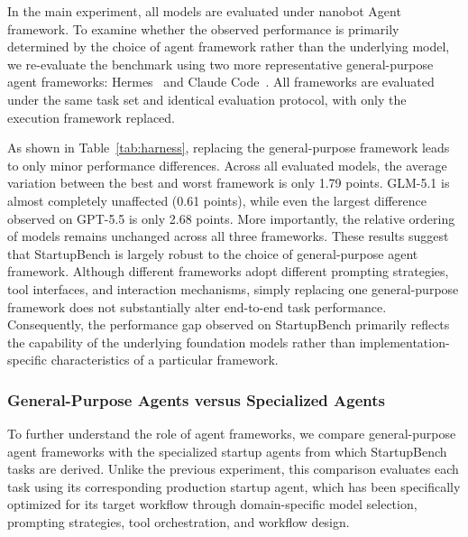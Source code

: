 


In the main experiment, all models are evaluated under nanobot Agent framework. To examine whether the observed performance is primarily determined by the choice of agent framework rather than the underlying model, we re-evaluate the benchmark using two more representative general-purpose agent frameworks: Hermes~\cite{hermes_agent} and Claude Code~\cite{anthropic_claude_code}. All frameworks are evaluated under the same task set and identical evaluation protocol, with only the execution framework replaced.

As shown in Table~\ref{tab:harness}, replacing the general-purpose framework leads to only minor performance differences. Across all evaluated models, the average variation between the best and worst framework is only 1.79 points. GLM-5.1 is almost completely unaffected (0.61 points), while even the largest difference observed on GPT-5.5 is only 2.68 points. More importantly, the relative ordering of models remains unchanged across all three frameworks.
These results suggest that StartupBench is largely robust to the choice of general-purpose agent framework. Although different frameworks adopt different prompting strategies, tool interfaces, and interaction mechanisms, simply replacing one general-purpose framework does not substantially alter end-to-end task performance. Consequently, the performance gap observed on StartupBench primarily reflects the capability of the underlying foundation models rather than implementation-specific characteristics of a particular framework.

\subsubsection{General-Purpose Agents versus Specialized Agents}

To further understand the role of agent frameworks, we compare general-purpose agent frameworks with the specialized startup agents from which StartupBench tasks are derived. Unlike the previous experiment, this comparison evaluates each task using its corresponding production startup agent, which has been specifically optimized for its target workflow through domain-specific model selection, prompting strategies, tool orchestration, and workflow design.


